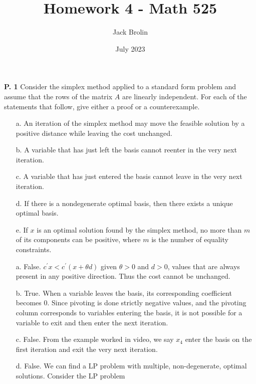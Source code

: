 \documentclass{article}
\title{Homework 4 - Math 525}
\author{Jack Brolin}
\date{July 2023}
\begin{document}
\maketitle

\begin{jacklist}
    \begin{framed} 
    \item [\textbf{P. 1}] Consider the simplex method applied to a standard form problem and assume that the rows of the matrix 
        $A$ are linearly independent. For each of the statements that follow, give either a proof or a counterexample.
        \begin{itemize}
            \item [a.] An iteration of the simplex method may move the feasible solution by a positive distance while leaving 
                the cost unchanged.
            \item [b.] A variable that has just left the basis cannot reenter in the very next iteration.
            \item [c.] A variable that has just entered the basis cannot leave in the very next iteration.
            \item [d.] If there is a nondegenerate optimal basis, then there exists a unique optimal basis.
            \item [e.] If $x$ is an optimal solution found by the simplex method, no more than $m$ of its components can be positive, 
                where $m$ is the number of equality constraints.
        \end{itemize}
    \end{framed}
    \begin{itemize}
        \item [a.] False. $c^\prime x < c^\prime(x + \theta d)$ given $\theta > 0$ and $d > 0$, values that are always 
            present in any positive direction. Thus the cost cannot be unchanged.
        \item [b.] True. When a variable leaves the basis, its corresponding coefficient becomes 0. Since pivoting is done strictly 
            negative values, and the pivoting column corresponds to variables entering the basis, it is not possible for a variable to 
            exit and then enter the next iteration. 
        \item [c.] False. From the example worked in video, we say $x_4$ enter the basis on the first iteration and exit the very next 
            iteration. 
        \item [d.] False. We can find a LP problem with multiple, non-degenerate, optimal solutions. Consider the LP problem 

\end{itemize}
\end{jacklist}
\end{document}
